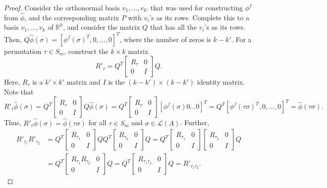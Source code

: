 \documentclass[prodmode,acmec]{ec-acmsmall}
\newcommand{\calL}{{\mathcal{L}}}
\newcommand{\rank}{{\calL(A)}}
\begin{document}
\begin{proof}
Consider the orthonormal basis $v_1,\ldots,v_{k'}$ that was used for constructing $\phi^f$ from $\hat{\phi}$, and the corresponding matrix $P$ with $v_i$'s as its rows. Complete this to a basis $v_1,\ldots,v_k$ of $\mathbb{R}^k$, and consider the matrix $Q$ that has all the $v_i$'s as its rows. Then, $Q \hat{\phi}(\sigma) = [\phi^f(\sigma)^T, 0, \ldots, 0]^T$, where the number of zeros is $k-k'$. For a permutation $\tau \in S_m$, construct the $k \times k$ matrix 
$$
R'_{\tau} = Q^T \left[ \begin{smallmatrix} R_{\tau} & 0 \\ 0 & I \end{smallmatrix} \right] Q. 
$$
Here, $R_{\tau}$ is a $k' \times k'$ matrix and $I$ is the $(k-k') \times (k-k')$ identity matrix. Note that 
$$
R'_{\tau} \hat{\phi}(\sigma) = Q^T \left[ \begin{smallmatrix} R_{\tau} & 0 \\ 0 & I \end{smallmatrix} \right] Q \hat{\phi}(\sigma) = Q^T \left[ \begin{smallmatrix} R_{\tau} & 0 \\ 0 & I \end{smallmatrix} \right] [\phi^f(\sigma) 0 \ldots 0]^T = Q^T [\phi^f(\tau \sigma)^T, 0, \ldots, 0]^T = \hat{\phi}(\tau \sigma).
$$
Thus, $R'_{\tau} \hat{\phi}(\sigma) = \hat{\phi}(\tau \sigma)$ for all $\tau \in S_m$ and $\sigma \in \rank$. Further, 
\begin{align*}
R'_{\tau_1} R'_{\tau_2} &= Q^T \left[ \begin{smallmatrix} R_{\tau_1} & 0 \\ 0 & I \end{smallmatrix} \right] Q Q^T \left[ \begin{smallmatrix} R_{\tau_2} & 0 \\ 0 & I \end{smallmatrix} \right] Q = Q^T \left[ \begin{smallmatrix} R_{\tau_1} & 0 \\ 0 & I \end{smallmatrix} \right] \left[ \begin{smallmatrix} R_{\tau_2} & 0 \\ 0 & I \end{smallmatrix} \right] Q \\
&= Q^T \left[ \begin{smallmatrix} R_{\tau_1} R_{\tau_2} & 0 \\ 0 & I \end{smallmatrix} \right] Q = Q^T \left[ \begin{smallmatrix} R_{\tau_1 \tau_2} & 0 \\ 0 & I \end{smallmatrix} \right] Q = R'_{\tau_1 \tau_2}.

\end{align*}
\end{proof}
\end{document}
